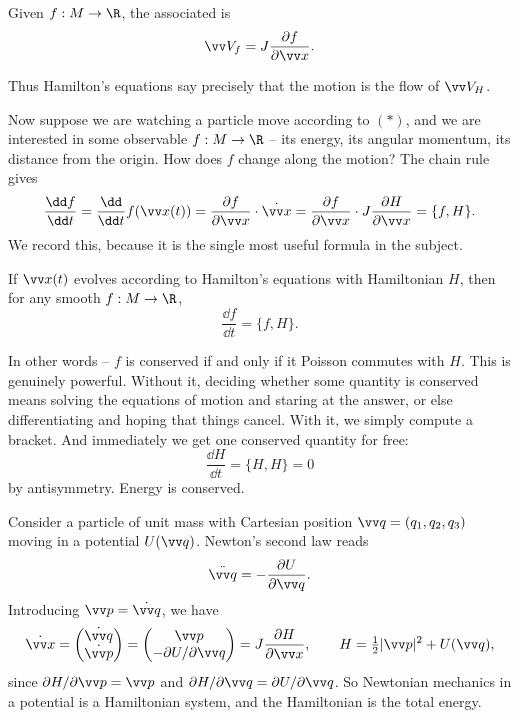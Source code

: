 \begin{definition}
	Given $f : M \to \R$, the associated  is
	$$
	\vv V_f = J \frac{\partial f}{\partial \vv x}.
	$$
\end{definition}

Thus Hamilton's equations say precisely that the motion is the flow of $\vv V_H$.

Now suppose we are watching a particle move according to $(*)$, and we are interested in some observable $f : M \to \R$ -- its energy, its angular momentum, its distance from the origin. How does $f$ change along the motion? The chain rule gives
$$
\frac{\dd f}{\dd t} = \frac{\dd}{\dd t}f(\vv x(t)) = \frac{\partial f}{\partial \vv x}\cdot \dot{\vv x} = \frac{\partial f}{\partial \vv x}\cdot J\frac{\partial H}{\partial \vv x} = \{f, H\}.
$$
We record this, because it is the single most useful formula in the subject.

\begin{proposition}
	If $\vv x(t)$ evolves according to Hamilton's equations with Hamiltonian $H$, then for any smooth $f : M \to \R$,
	$$
	\frac{\dd f}{\dd t} = \{f, H\}.
	$$
\end{proposition}

In other words -- $f$ is conserved if and only if it Poisson commutes with $H$. This is genuinely powerful. Without it, deciding whether some quantity is conserved means solving the equations of motion and staring at the answer, or else differentiating and hoping that things cancel. With it, we simply compute a bracket. And immediately we get one conserved quantity for free:
$$
\frac{\dd H}{\dd t} = \{H, H\} = 0
$$
by antisymmetry. Energy is conserved.

\begin{example}
	Consider a particle of unit mass with Cartesian position $\vv q = (q_1,q_2,q_3)$ moving in a potential $U(\vv q)$. Newton's second law reads
	$$
	\ddot{\vv q} = -\frac{\partial U}{\partial \vv q}.
	$$
	Introducing $\vv p = \dot{\vv q}$, we have
	$$
	\dot{\vv x} = \begin{pmatrix}\dot{\vv q}\\ \dot{\vv p}\end{pmatrix} = \begin{pmatrix} \vv p \\ -\partial U/\partial \vv q\end{pmatrix} = J\frac{\partial H}{\partial \vv x}, \qquad H = \tfrac{1}{2}|\vv p|^2 + U(\vv q),
	$$
	since $\partial H/\partial \vv p = \vv p$ and $\partial H/\partial\vv q = \partial U/\partial \vv q$. So Newtonian mechanics in a potential is a Hamiltonian system, and the Hamiltonian is the total energy.
\end{example}

